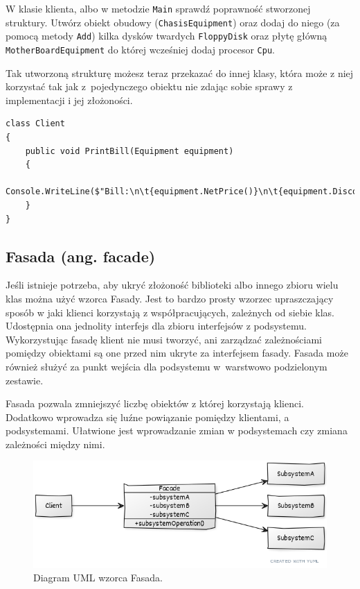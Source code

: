 W klasie klienta, albo w metodzie \texttt{Main} sprawdź poprawność stworzonej struktury. Utwórz obiekt obudowy (\texttt{ChasisEquipment}) oraz dodaj do niego (za pomocą metody \texttt{Add}) kilka dysków twardych \texttt{FloppyDisk} oraz płytę główną \texttt{MotherBoardEquipment} do której wcześniej dodaj procesor \texttt{Cpu}.

Tak utworzoną strukturę możesz teraz przekazać do innej klasy, która może z niej korzystać tak jak z~pojedynczego obiektu nie zdając sobie sprawy z implementacji i jej złożoności.
\begin{lstlisting}
class Client
{
	public void PrintBill(Equipment equipment)
	{
		Console.WriteLine($"Bill:\n\t{equipment.NetPrice()}\n\t{equipment.DiscountPrice()}\n\t{equipment.Power()}");
	}
}
\end{lstlisting}

\subsection{Fasada (ang. facade)}
Jeśli istnieje potrzeba, aby ukryć złożoność biblioteki albo innego zbioru wielu klas można użyć wzorca Fasady. Jest to bardzo prosty wzorzec upraszczający sposób w jaki klienci korzystają z współpracujących, zależnych od siebie klas. Udostępnia ona jednolity interfejs dla zbioru interfejsów z podsystemu. Wykorzystując fasadę klient nie musi tworzyć, ani zarządzać zależnościami pomiędzy obiektami są one przed nim ukryte za interfejsem fasady. Fasada może również służyć za punkt wejścia dla podsystemu w~warstwowo podzielonym zestawie.

Fasada pozwala zmniejszyć liczbę obiektów z której korzystają klienci. Dodatkowo wprowadza się luźne powiązanie pomiędzy klientami, a podsystemami. Ułatwione jest wprowadzanie zmian w podsystemach czy zmiana zależności między nimi. 

\begin{figure}[hbt!]
	\centering
	\includegraphics[width=0.8\linewidth]{images/FacadeUml}
	\caption{Diagram UML wzorca Fasada.}
	\label{lab3/fig/FacadeUml}
\end{figure}
%

